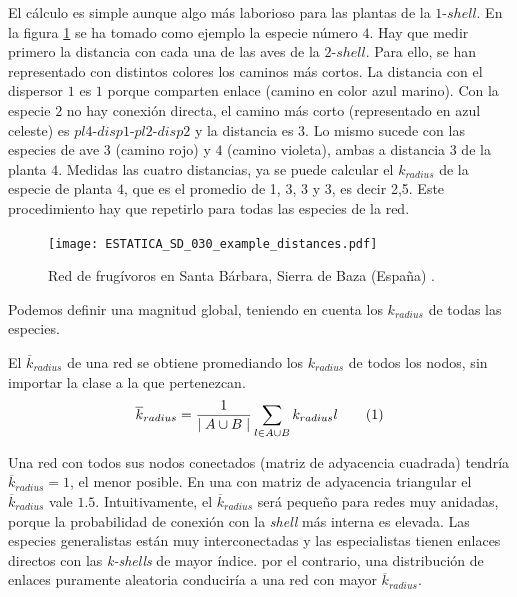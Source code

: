 El cálculo es simple aunque algo más laborioso para las plantas de la $1$-$shell$. En la figura \ref{fig:ESTATICA_SD_030_example_distances} se ha tomado como ejemplo la especie número $4$. Hay que medir primero la distancia con cada una de las aves de la $2$-$shell$. Para ello, se han representado con distintos colores los caminos más cortos. La distancia con el dispersor $1$ es $1$ porque comparten enlace (camino en color azul marino). Con la especie $2$ no hay conexión directa, el camino más corto (representado en azul celeste) es $pl4$-$disp1$-$pl2$-$disp2$ y la distancia es $3$. Lo mismo sucede con las especies de ave $3$ (camino rojo) y $4$ (camino violeta), ambas a distancia $3$ de la planta $4$. Medidas las cuatro distancias, ya se puede calcular el $k_{radius}$ de la especie de planta $4$, que es el promedio de 1, 3, 3 y 3, es decir 2,5. Este procedimiento hay que repetirlo para todas las especies de la red.

\begin{figure}[h!]
\centering
\texttt{[image: ESTATICA\_SD\_030\_example\_distances.pdf]}
\caption {Red de frugívoros en Santa Bárbara, Sierra de Baza (España) \cite{jordano1993geographical}.}
\label{fig:ESTATICA_SD_030_example_distances}
\end{figure}

Podemos definir una magnitud global, teniendo en cuenta los $k_{radius}$ de todas las especies.

\begin{theo} 
El \textit{$\overline k_{radius}$} de una red se obtiene promediando los ${k}_{radius}$ de todos los nodos, sin importar la clase a la que pertenezcan.
\begin{align*}
\displaystyle
\overline {k}_{radius} = \frac{1}{\mid A \cup B \mid}\sum\limits_{l \in A \cup B} k_{radius}l
\stepcounter{equation}\tag{\theequation}\label{avgkradius}
\end{align*}
\label{ESTATICA_avgkradius}
\end{theo}

Una red con todos sus nodos conectados (matriz de adyacencia cuadrada) tendría $\overline {k}_{radius}=1$, el menor posible. En una con matriz de adyacencia triangular el $\overline {k}_{radius}$ vale $1.5$. Intuitivamente, el $\overline {k}_{radius}$ será pequeño para redes muy anidadas, porque la probabilidad de conexión con la \textit{shell} más interna es elevada. Las especies generalistas están muy interconectadas y las especialistas tienen enlaces directos con las \textit{k-shells} de mayor índice. por el contrario, una distribución de enlaces puramente aleatoria conduciría a una red con mayor $\overline {k}_{radius}$.


